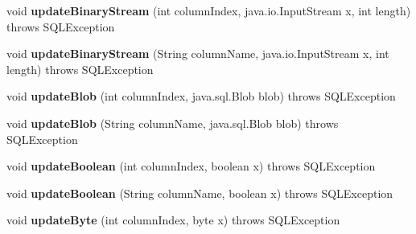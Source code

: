 \begin{DoxyCompactItemize}
\item 
\mbox{\label{classcom_1_1mysql_1_1cj_1_1jdbc_1_1result_1_1_updatable_result_set_ad570ab6558e64594bcd639021d762cc5}} 
void {\bfseries update\+Binary\+Stream} (int column\+Index, java.\+io.\+Input\+Stream x, int length)  throws S\+Q\+L\+Exception 
\item 
\mbox{\label{classcom_1_1mysql_1_1cj_1_1jdbc_1_1result_1_1_updatable_result_set_aa271ae53fc1747a90624c45cb6c61fbc}} 
void {\bfseries update\+Binary\+Stream} (String column\+Name, java.\+io.\+Input\+Stream x, int length)  throws S\+Q\+L\+Exception 
\item 
\mbox{\label{classcom_1_1mysql_1_1cj_1_1jdbc_1_1result_1_1_updatable_result_set_acc0afdc6f806da399def6402a03387aa}} 
void {\bfseries update\+Blob} (int column\+Index, java.\+sql.\+Blob blob)  throws S\+Q\+L\+Exception 
\item 
\mbox{\label{classcom_1_1mysql_1_1cj_1_1jdbc_1_1result_1_1_updatable_result_set_a06fd4402c77652a45f2abf31514e8db2}} 
void {\bfseries update\+Blob} (String column\+Name, java.\+sql.\+Blob blob)  throws S\+Q\+L\+Exception 
\item 
\mbox{\label{classcom_1_1mysql_1_1cj_1_1jdbc_1_1result_1_1_updatable_result_set_aab318e4e28193f43eb100eb7758e9799}} 
void {\bfseries update\+Boolean} (int column\+Index, boolean x)  throws S\+Q\+L\+Exception 
\item 
\mbox{\label{classcom_1_1mysql_1_1cj_1_1jdbc_1_1result_1_1_updatable_result_set_aaa5f0fc037bf434c6ce5a257d0023027}} 
void {\bfseries update\+Boolean} (String column\+Name, boolean x)  throws S\+Q\+L\+Exception 
\item 
\mbox{\label{classcom_1_1mysql_1_1cj_1_1jdbc_1_1result_1_1_updatable_result_set_af97ef94666c69719912cf33fb204a9fa}} 
void {\bfseries update\+Byte} (int column\+Index, byte x)  throws S\+Q\+L\+Exception 

\end{DoxyCompactItemize}
